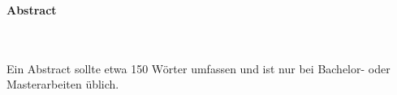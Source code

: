 %
%
%

\thispagestyle{empty}

\begin{adjustwidth}{-2cm}{}






\begin{Huge}\textbf{
\newline
\newline
\newline
\newline
\newline %
Abstract}\end{Huge} \\ \\

Ein Abstract sollte etwa 150 Wörter umfassen und ist nur bei Bachelor- oder Masterarbeiten üblich.






\end{adjustwidth}

